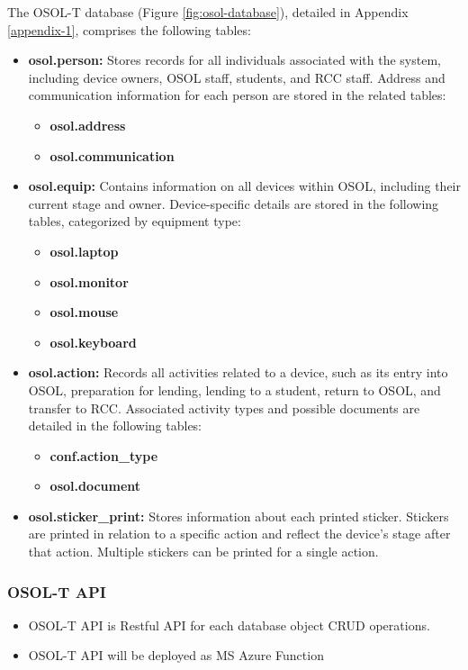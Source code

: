 \documentclass[a4paper,11pt]{article}
\begin{document}
The OSOL-T database (Figure \ref{fig:osol-database}), detailed in Appendix \ref{appendix-1}, comprises the following tables:
\begin{itemize}
	\item \textbf{osol.person:} Stores records for all individuals associated with the system, including device owners, OSOL staff, students, and RCC staff.  Address and communication information for each person are stored in the related tables:
	\begin{itemize}
		\item \textbf{osol.address}
		\item \textbf{osol.communication}
	\end{itemize}
	\item \textbf{osol.equip:} Contains information on all devices within OSOL, including their current stage and owner.  Device-specific details are stored in the following tables, categorized by equipment type:
	\begin{itemize}
		\item \textbf{osol.laptop}
		\item \textbf{osol.monitor}
		\item \textbf{osol.mouse}
		\item \textbf{osol.keyboard}
	\end{itemize}
	\item \textbf{osol.action:} Records all activities related to a device, such as its entry into OSOL, preparation for lending, lending to a student, return to OSOL, and transfer to RCC.  Associated activity types and possible documents are detailed in the following tables:
	\begin{itemize}
		\item \textbf{conf.action\_type}
		\item \textbf{osol.document}
	\end{itemize}
	\item \textbf{osol.sticker\_print:} Stores information about each printed sticker.  Stickers are printed in relation to a specific action and reflect the device's stage after that action.  Multiple stickers can be printed for a single action.
\end{itemize}

\subsubsection{OSOL-T API}
\begin{itemize}
	\item OSOL-T API is Restful API for each database object CRUD operations.
	\item OSOL-T API will be deployed as MS Azure Function 
\end{itemize}
\end{document}
